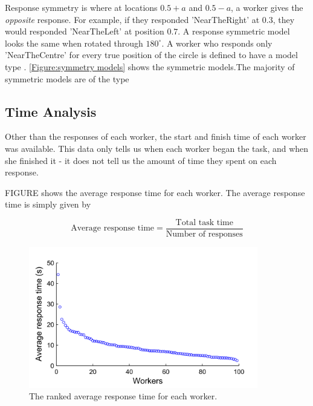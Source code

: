 Response symmetry is where at locations $0.5 + a$ and $0.5-a$, a worker gives the \textit{opposite} response. For example, if they responded 'NearTheRight' at $0.3$, they would responded 'NearTheLeft' at position $0.7$. A response symmetric model looks the same when rotated through $180^\circ$. A worker who responds only 'NearTheCentre' for every true position of the circle is defined to have a model type \trueSym. \ref{Figure:symmetry models} shows the symmetric models.The majority of symmetric models are of the type \resSym



\subsection{Time Analysis}

Other than the responses of each worker, the start and finish time of each worker was available. This data only tells us when each worker began the task, and when she finished it - it does not tell us the amount of time they spent on each response.

FIGURE shows the average response time for each worker. The average response time is simply given by 

\[ 
\text{Average response time} = \frac{\text{Total task time}}{\text{Number of responses}}
\]

\begin{figure}
\centering
\includegraphics[width=10cm]{line_time_all_responses.png}
\caption{The ranked average response time for each worker.  }
\label{Figure: average_response_time}
\end{figure}



